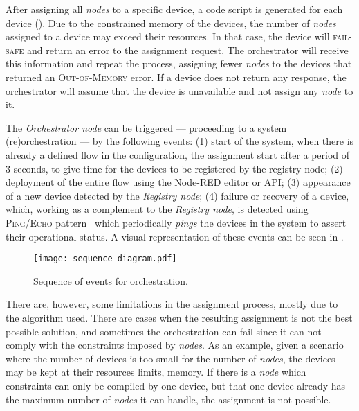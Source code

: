 After assigning all \textit{nodes} to a specific device, a code script is generated for each device (\cf {}). Due to the constrained memory of the devices, the number of \textit{nodes} assigned to a device may exceed their resources. In that case, the device will \textsc{fail-safe} and return an error to the assignment request. The orchestrator will receive this information and repeat the process, assigning fewer \textit{nodes} to the devices that returned an \textsc{Out-of-Memory} error. If a device does not return any response, the orchestrator will assume that the device is unavailable and not assign any \textit{node} to it.

The \textit{Orchestrator node} can be triggered --- proceeding to a system (re)orchestration --- by the following events: (1) start of the system, when there is already a defined flow in the configuration, the assignment start after a period of 3 seconds, to give time for the devices to be registered by the registry node; (2) deployment of the entire flow using the Node-RED editor or API; (3) appearance of a new device detected by the \textit{Registry node}; (4) failure or recovery of a device, which, working as a complement to the \textit{Registry node}, is detected using \textsc{Ping/Echo} pattern~\cite{Scott2009} which periodically \textit{pings} the devices in the system to assert their operational status. A visual representation of these events can be seen in . 

\begin{figure}[h]
\centering
\texttt{[image: sequence-diagram.pdf]}
\caption[Sequence of events for orchestration.]{Sequence of events for orchestration.}\label{fig:sequence_diagram}
\end{figure}

There are, however, some limitations in the assignment process, mostly due to the algorithm used. There are cases when the resulting assignment is not the best possible solution, and sometimes the orchestration can fail since it can not comply with the constraints imposed by \textit{nodes}. As an example, given a scenario where the number of devices is too small for the number of \textit{nodes}, the devices may be kept at their resources limits, \ie memory. If there is a \textit{node} which constraints can only be compiled by one device, but that one device already has the maximum number of \textit{nodes} it can handle, the assignment is not possible.


